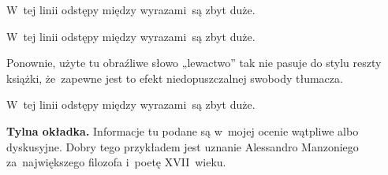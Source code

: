 \documentclass[a4paper,11pt]{article}
\begin{document}
\start {} W~tej linii odstępy między wyrazami~są zbyt
duże.

\vspace{\spaceFour}





\start {} W~tej linii odstępy między wyrazami~są zbyt
duże.

\vspace{\spaceFour}





\start {} Ponownie, użyte tu obraźliwe słowo „lewactwo”
tak nie pasuje do stylu reszty książki, że~zapewne jest to efekt
niedopuszczalnej swobody tłumacza.

\vspace{\spaceFour}





\start {} W~tej linii odstępy między wyrazami~są zbyt
duże.

\vspace{\spaceFour}





\start \textbf{Tylna okładka.} Informacje tu podane są w~mojej ocenie
wątpliwe albo dyskusyjne. Dobry tego przykładem jest uznanie
Alessandro Manzoniego za~największego filozofa i~poetę XVII~wieku.

\vspace{\spaceFour}





\end{document}
